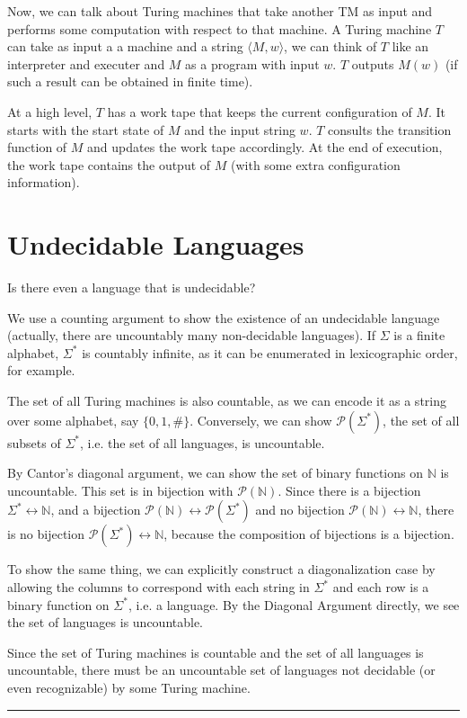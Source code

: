 \documentclass[twoside]{article}
\newenvironment{proof}{{\bf Proof:}}{\hfill\rule{2mm}{2mm}}
\begin{document}

Now, we can talk about Turing machines that take another TM as input and performs some computation with respect to that machine.  A Turing machine $T$ can take as input a a machine and a string $\langle M,w\rangle$, we can think of $T$ like an interpreter and executer and $M$ as a program with input $w$.  $T$ outputs $M(w)$ (if such a result can be obtained in finite time).

  At a high level, $T$ has a work tape that keeps the current configuration of $M$.  It starts with the start state of $M$ and the input string $w$.  $T$ consults the transition function of $M$ and updates the work tape accordingly.  At the end of execution, the work tape contains the output of $M$ (with some extra configuration information).


\section*{Undecidable Languages}

Is there even a language that is undecidable?


\begin{proof}
	
	We use a counting argument to show the existence of an undecidable language (actually, there are uncountably many non-decidable languages).  If $\Sigma$ is a finite alphabet, $\Sigma^*$ is countably infinite, as it can be enumerated in lexicographic order, for example.  
	
	The set of all Turing machines is also countable, as we can encode it as a string over some alphabet, say $\{0,1,\#\}$.  Conversely, we can show $\mathcal{P}(\Sigma^*)$, the set of all subsets of $\Sigma^*$, i.e. the set of all languages, is uncountable.  
	
	By Cantor's diagonal argument, we can show the set of binary functions on $\mathbb{N}$ is uncountable.  This set is in bijection with $\mathcal{P}(\mathbb{N})$.  Since there is a bijection  $\Sigma^* \longleftrightarrow \mathbb{N}$, and a bijection $\mathcal{P}(\mathbb{N}) \longleftrightarrow \mathcal{P}(\Sigma^*)$ and no  bijection  $\mathcal{P}(\mathbb{N})\longleftrightarrow \mathbb{N}$, there is no bijection $\mathcal{P}(\Sigma^*) \longleftrightarrow \mathbb{N}$, because the composition of bijections is a bijection.
	
	To show the same thing, we can explicitly construct a diagonalization case by allowing the columns to correspond with each string in $\Sigma^*$ and each row is a binary function on $\Sigma^*$, i.e. a language.  By the Diagonal Argument directly, we see the set of languages is uncountable.
	
	Since the set of Turing machines is countable and the set of all languages is uncountable, there must be an uncountable set of languages not decidable (or even recognizable) by some Turing machine.
	
	
\end{proof}
\end{document}
